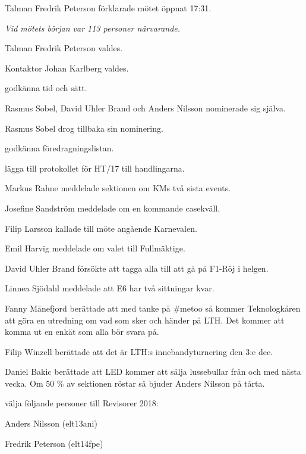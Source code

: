 \documentclass[10pt]{article}
\def\mo{Fredrik Peterson}
\def\ms{Johan Karlberg}
\begin{document}
\begin{paragrafer}
Talman {\mo} förklarade mötet öppnat 17:31.

\emph{Vid mötets början var 113 personer närvarande.}

Talman {\mo} valdes.

Kontaktor {\ms} valdes.


\Mba godkänna tid och sätt.

Rasmus Sobel, David Uhler Brand och Anders Nilsson nominerade sig själva.

Rasmus Sobel drog tillbaka sin nominering.

\valavj

\emph{\ingaadj}

\Mba godkänna föredragningslistan.

\Mba lägga till protokollet för HT/17 till handlingarna.

Markus Rahne meddelade sektionen om KMs två sista events.

Josefine Sandström meddelade om en kommande casekväll.

Filip Larsson kallade till möte angående Karnevalen.

Emil Harvig meddelade om valet till Fullmäktige.

David Uhler Brand försökte att tagga alla till att gå på F1-Röj i helgen.

Linnea Sjödahl meddelade att E6 har två sittningar kvar.

Fanny Månefjord berättade att med tanke på \#metoo så kommer Teknologkåren att göra en utredning om vad som sker och händer på LTH. Det kommer att komma ut en enkät som alla bör svara på.

Filip Winzell berättade att det är LTH:s innebandyturnering den 3:e dec.

Daniel Bakic berättade att LED kommer att sälja lussebullar från och med nästa vecka.
Om 50 \% av sektionen röstar så bjuder Anders Nilsson på tårta.
\newpage
{}
\begin{paralist}
    \Mba välja följande personer till Revisorer 2018:
    \begin{tightdashlist}
        \item Anders Nilsson (elt13ani)
        \item Fredrik Peterson (elt14fpe)
    \end{tightdashlist}


\end{paralist}
\end{paragrafer}
\end{document}
